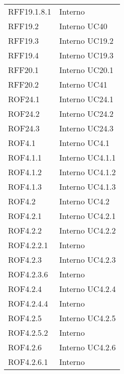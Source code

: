 \begin{longtable}{p{2.5cm}!{\VRule[1pt]}p{2.5cm}}
	RFF19.1.8.1 & Interno \\
	RFF19.2 & Interno \newline UC40
	\\
	RFF19.3 & Interno \newline UC19.2
	\\
	RFF19.4 & Interno \newline UC19.3
	\\
	RFF20.1 & Interno \newline UC20.1
	\\
	RFF20.2 & Interno \newline UC41
	\\
	ROF24.1 & Interno \newline UC24.1
	\\
	ROF24.2 & Interno \newline UC24.2
	\\
	ROF24.3 & Interno \newline UC24.3
	\\
	ROF4.1 & Interno \newline UC4.1
	\\
	ROF4.1.1 & Interno \newline UC4.1.1
	\\
	ROF4.1.2 & Interno \newline UC4.1.2
	\\
	ROF4.1.3 & Interno \newline UC4.1.3
	\\
	ROF4.2 & Interno \newline UC4.2
	\\
	ROF4.2.1 & Interno \newline UC4.2.1
	\\
	ROF4.2.2 & Interno \newline UC4.2.2
	\\
	ROF4.2.2.1 & Interno \\
	ROF4.2.3 & Interno \newline UC4.2.3
	\\
	ROF4.2.3.6 & Interno \\
	ROF4.2.4 & Interno \newline UC4.2.4
	\\
	ROF4.2.4.4 & Interno \\
	ROF4.2.5 & Interno \newline UC4.2.5
	\\
	ROF4.2.5.2 & Interno \\
	ROF4.2.6 & Interno \newline UC4.2.6
	\\
	ROF4.2.6.1 & Interno \\

\end{longtable}
